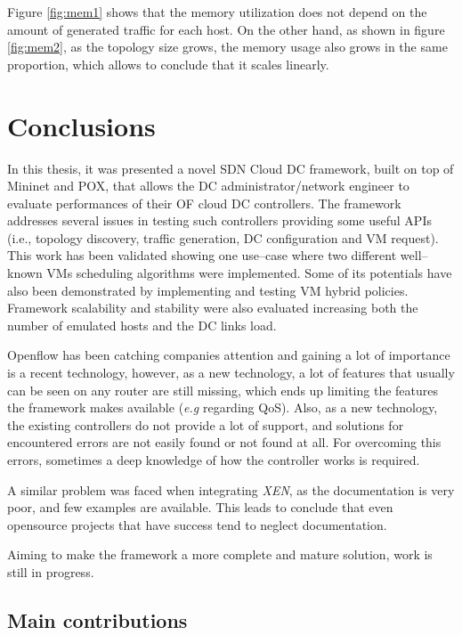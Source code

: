 \documentclass[12pt,english,oneside]{book}
\begin{document}
Figure \ref{fig:mem1} shows that the memory utilization does not depend on the amount of generated traffic for each host.
On the other hand, as shown in figure \ref{fig:mem2}, as the topology size grows, the memory usage also grows in the same proportion, which allows to conclude that it scales linearly.
\newpage

\chapter{Conclusions\label{cha:conclusions}}
\hspace{0.6cm}

In this thesis, it was presented a novel SDN Cloud DC framework, built on top of Mininet and POX, that allows the DC administrator/network engineer to evaluate performances of their OF cloud DC controllers.
The framework addresses several issues in testing such controllers providing some useful APIs (i.e., topology discovery, traffic generation, DC configuration and VM request).
This work has been validated showing one use--case where two different well--known VMs scheduling algorithms were implemented.
Some of its potentials have also been demonstrated by implementing and testing VM hybrid policies.
Framework scalability and stability were also evaluated increasing both the number of emulated hosts and the DC links load. 

Openflow has been catching companies attention and gaining a lot of importance is a recent technology, however, as a new technology, a lot of features that usually can be seen on any router are still missing, which ends up limiting the features the framework makes available (\textit{e.g} regarding QoS).
Also, as a new technology, the existing controllers do not provide a lot of support, and solutions for encountered errors are not easily found or not found at all. For overcoming this errors, sometimes a deep knowledge of how the controller works is required.

A similar problem was faced when integrating \textit{XEN}, as the documentation is very poor, and few examples are available. This leads to conclude that even opensource projects that have success tend to neglect documentation.

Aiming to make the framework a more complete and mature solution, work is still in progress.

\section{Main contributions}
\hspace{0.6cm}
\end{document}
